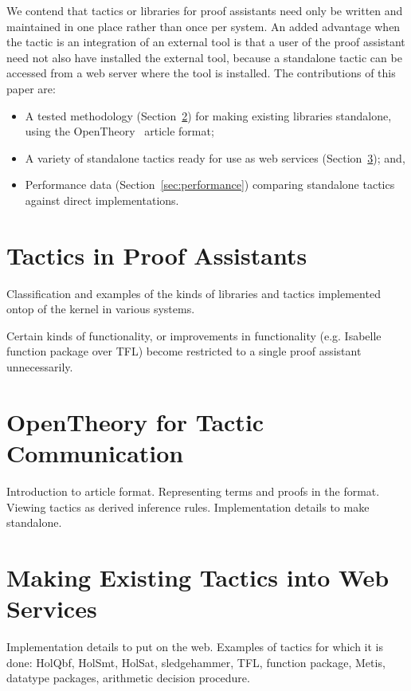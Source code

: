 \documentclass{llncs}
\newcommand{\OpenTheory}{OpenTheory\xspace}
\newcommand{\secref}[1]{Section~\ref{sec:#1}}
\begin{document}
We contend that tactics or libraries for proof assistants need only be written and maintained in one place rather than once per system. 
An added advantage when the tactic is an integration of an external tool is that a user of the proof assistant need not also have installed the external tool, because a standalone tactic can be accessed from a web server where the tool is installed.
The contributions of this paper are:
\begin{itemize}
\item
A tested methodology (\secref{opentheory}) for making existing libraries standalone, using the \OpenTheory~\cite{hurd2009} article format;
\item
A variety of standalone tactics ready for use as web services (\secref{web}); and,
\item
Performance data (\secref{performance}) comparing standalone tactics against direct implementations.
\end{itemize}

\section{Tactics in Proof Assistants}

Classification and examples of the kinds of libraries and tactics implemented ontop of the kernel in various systems.

Certain kinds of functionality, or improvements in functionality (e.g. Isabelle function package over TFL) become restricted to a single proof assistant unnecessarily.

\section{\OpenTheory for Tactic Communication}
\label{sec:opentheory}

Introduction to article format.
Representing terms and proofs in the format.
Viewing tactics as derived inference rules.
Implementation details to make standalone.

\section{Making Existing Tactics into Web Services}
\label{sec:web}

Implementation details to put on the web.
Examples of tactics for which it is done: HolQbf, HolSmt, HolSat, sledgehammer, TFL, function package, Metis, datatype packages, arithmetic decision procedure.
\end{document}
